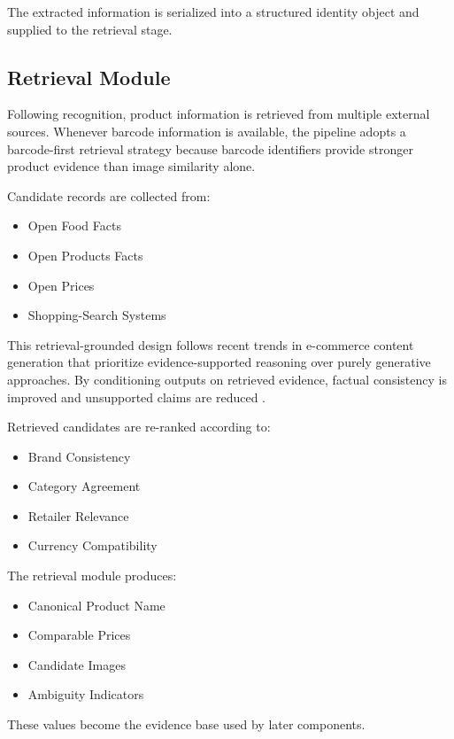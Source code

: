 \documentclass[conference]{IEEEtran}
\begin{document}
The extracted information is serialized into a structured identity
object and supplied to the retrieval stage.

\subsection{Retrieval Module}

Following recognition, product information is retrieved from multiple
external sources. Whenever barcode information is available, the
pipeline adopts a barcode-first retrieval strategy because barcode
identifiers provide stronger product evidence than image similarity
alone.

Candidate records are collected from:

\begin{itemize}
\item Open Food Facts
\item Open Products Facts
\item Open Prices
\item Shopping-Search Systems
\end{itemize}

This retrieval-grounded design follows recent trends in e-commerce
content generation that prioritize evidence-supported reasoning over
purely generative approaches. By conditioning outputs on retrieved
evidence, factual consistency is improved and unsupported claims are
reduced \cite{li2024modict}.

Retrieved candidates are re-ranked according to:

\begin{itemize}
\item Brand Consistency
\item Category Agreement
\item Retailer Relevance
\item Currency Compatibility
\end{itemize}

The retrieval module produces:

\begin{itemize}
\item Canonical Product Name
\item Comparable Prices
\item Candidate Images
\item Ambiguity Indicators
\end{itemize}

These values become the evidence base used by later components.
\end{document}
